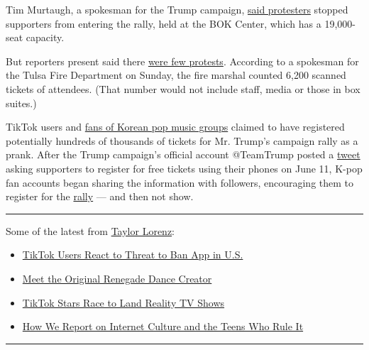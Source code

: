 Tim Murtaugh, a spokesman for the Trump campaign,
\href{https://twitter.com/cmsub/status/1274473814211125249/photo/1}{said
protesters} stopped supporters from entering the rally, held at the BOK
Center, which has a 19,000-seat capacity.

But reporters present said there
\href{https://www.nytimes.com/2020/06/20/us/trump-rally-tulsa.html\#link-60a18f83}{were
few protests}. According to a spokesman for the Tulsa Fire Department on
Sunday, the fire marshal counted 6,200 scanned tickets of attendees.
(That number would not include staff, media or those in box suites.)

TikTok users and
\href{https://www.nytimes.com/2018/12/11/smarter-living/the-edit-k-pop.html}{fans
of Korean pop music groups} claimed to have registered potentially
hundreds of thousands of tickets for Mr. Trump's campaign rally as a
prank. After the Trump campaign's official account @TeamTrump posted a
\href{https://twitter.com/TeamTrump/status/1271205174611259393}{tweet}
asking supporters to register for free tickets using their phones on
June 11, K-pop fan accounts began sharing the information with
followers, encouraging them to register for the
\href{https://www.nytimes.com/2020/07/08/us/politics/trump-rally-portsmouth-new-hampshire.html}{rally}
--- and then not show.

\begin{center}\rule{0.5\linewidth}{\linethickness}\end{center}

Some of the latest from
\href{https://www.nytimes.com/by/taylor-lorenz}{Taylor Lorenz}:

\begin{itemize}
\item
  \href{https://www.nytimes.com/2020/07/10/style/tiktok-ban-us-users-influencers-taylor-lorenz.html}{TikTok
  Users React to Threat to Ban App in U.S.}
\item
  \href{https://www.nytimes.com/2020/02/13/style/the-original-renegade.html}{Meet
  the Original Renegade Dance Creator}
\item
  \href{https://www.nytimes.com/2020/07/09/style/tiktok-stars-race-to-land-reality-shows.html}{TikTok
  Stars Race to Land Reality TV Shows}
\item
  \href{https://www.nytimes.com/2020/07/16/style/taylor-lorenz-internet-culture-reporting.html}{How
  We Report on Internet Culture and the Teens Who Rule It}
\end{itemize}

\begin{center}\rule{0.5\linewidth}{\linethickness}\end{center}

